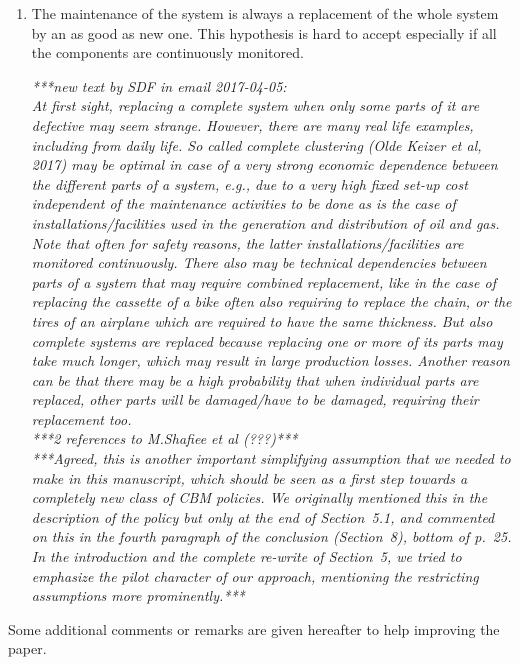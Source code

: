 \documentclass[authoryear]{elsarticle}
\begin{document}
\begin{enumerate}
\item The maintenance of the system is always a replacement of the whole system by an as good as new one. This hypothesis is hard to accept especially if all the components are continuously monitored. 

\smallskip

\emph{***new text by SDF in email 2017-04-05:\\
{\scriptsize
At first sight, replacing a complete system when only some parts of it are defective may seem strange.
However, there are many real life examples, including from daily life.
So called complete clustering (Olde Keizer et al, 2017)
may be optimal in case of a very strong economic dependence between the different parts of a system,
e.g., due to a very high fixed set-up cost independent of the maintenance activities to be done
as is the case of installations/facilities used in the generation and distribution of oil and gas.
Note that often for safety reasons, the latter installations/facilities are monitored continuously.
There also may be technical dependencies between parts of a system that may require combined replacement,
like in the case of replacing the cassette of a bike often also requiring to replace the chain,
or the tires of an airplane which are required to have the same thickness.
But also complete systems are replaced because replacing one or more of its parts may take much longer,
which may result in large production losses.
Another reason can be that there may be a high probability that when individual parts are replaced,
other parts will be damaged/have to be damaged, requiring their replacement too.
}\\
***2 references to M.Shafiee et al (???)***\\
***Agreed, this is another important simplifying assumption that we needed to make in this manuscript,
which should be seen as a first step towards a completely new class of CBM policies.
We originally mentioned this in the description of the policy but only at the end of Section~5.1,
and commented on this in the fourth paragraph of the conclusion (Section~8), bottom of p.~25.
In the introduction and the complete re-write of Section~5, we tried to emphasize the pilot character of our approach,
mentioning the restricting assumptions more prominently.***}
\end{enumerate}

Some additional comments or remarks are given hereafter to help improving the paper. 
\end{document}
